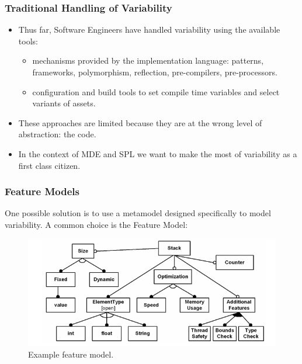 \documentclass{beamer}
\begin{document}
\begin{frame}
\frametitle{Traditional Handling of Variability}

\begin{itemize}

\item Thus far, Software Engineers have handled variability using the
  available tools:

\pause{}

  \begin{itemize}

  \item mechanisms provided by the implementation language: patterns,
    frameworks, polymorphism, reflection, pre-compilers,
    pre-processors.

    \pause{}

  \item configuration and build tools to set compile time variables
    and select variants of assets.

  \end{itemize}

  \pause{}

\item These approaches are limited because they are at the wrong level
  of abstraction: the code.

\pause{}

\item In the context of \ac{MDE} and \ac{SPL} we want to make the most
  of variability as a first class citizen.

\end{itemize}

\end{frame}

\begin{frame}
\frametitle{Feature Models}

One possible solution is to use a metamodel designed specifically to
model variability. A common choice is the Feature
Model\cite{czarnecki2000generative}:

\begin{figure}
  \centering
  \includegraphics[scale=0.4]{images/example_feature_model_voelter.png}
  \caption{Example feature model.\cite{groher2007expressing}}
\end{figure}

\end{frame}
\end{document}
